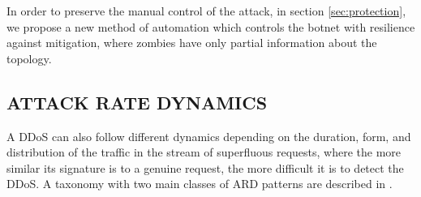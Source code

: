\documentclass[a4paper,twoside]{article}
\begin{document}

In order to preserve the manual control of the attack, in section \ref{sec:protection}, we propose a new method of automation which controls the botnet with resilience against mitigation, where zombies have only partial information about the topology.

\subsection{\uppercase{Attack rate dynamics}} \label{sec:ard}

A DDoS can also follow different dynamics depending on the duration, form, and distribution of the traffic in the stream of superfluous requests, where the more similar its signature is to a genuine request, the more difficult it is to detect the DDoS. A taxonomy with two main classes of ARD patterns are described in \cite{Liu:2012}.


\end{document}
